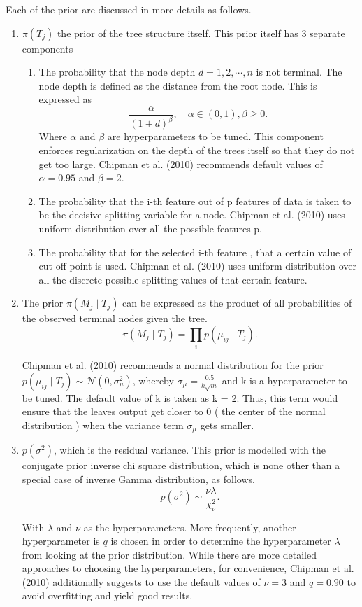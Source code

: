 \documentclass{usiinftr}
\begin{document}
Each of the prior are discussed in more details as follows.
\begin{enumerate}
\item $\pi(T_j)$ the prior of the tree structure itself. This prior itself has 3 separate components
			\begin{enumerate}
				\item The probability that the node depth $d = 1,2,\cdots,n$ is not terminal. The node depth is defined as the distance from the root node. This is expressed as 
			\begin{equation}\frac{\alpha}{(1+d)^{\beta}}, \quad \alpha \in (0,1), \beta \geq 0 . \end{equation}
			Where $\alpha$ and $\beta$ are hyperparameters to be tuned. This component enforces regularization on the depth of the trees itself so that they do not get too large. Chipman et al. (2010) recommends default values of $\alpha = 0.95$ and $\beta =2$.
				\item The probability that the i-th feature out of p features of data is taken to be the decisive splitting variable for a node. Chipman et al. (2010) uses uniform distribution over all the possible features p.
				\item The probability that for the selected i-th feature , that a certain value of cut off point is used. Chipman et al. (2010) uses uniform distribution over all the discrete possible splitting values of that certain feature.
			\end{enumerate} 
\item The prior $\pi(M_j \mid T_j)$ can be expressed as the product of all probabilities of the observed terminal nodes given the tree.
\begin{equation}\pi(M_j \mid T_j) = \prod_i p(\mu_{ij} \mid T_j). \end{equation}

Chipman et al. (2010) recommends a normal distribution for the prior $p( \mu_{ij} \mid T_j) \sim \mathcal{N}(0, \sigma^2_{ \mu })$, whereby $ \sigma_{ \mu } = \frac{0.5}{k \sqrt{m}}$  and k is a hyperparameter to be tuned. The default value of k is taken as k = 2. Thus, this term would ensure that the leaves output get closer to 0 ( the center of the normal distribution ) when the variance term $\sigma_{ \mu}$ gets smaller.
\item $p(\sigma^2)$, which is the residual variance. This prior is modelled with the conjugate prior inverse chi square distribution, which is none other than a special case of inverse Gamma distribution, as follows.
\begin{equation}p(\sigma^2) \sim \frac{\nu \lambda}{\chi_{\nu}^2}. \end{equation}

With $\lambda$ and $\nu$ as the hyperparameters. More frequently, another hyperparameter is $q$ is chosen in order to determine the hyperparameter $\lambda$ from looking at the prior distribution. While there are more detailed approaches to choosing the hyperparameters, for convenience, Chipman et al. (2010) additionally suggests to use the default values of $\nu = 3$ and $q = 0.90$ to avoid overfitting and yield good results.
\end{enumerate}
\end{document}
